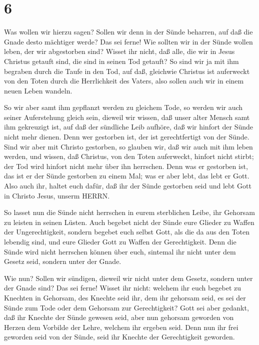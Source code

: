 \hypertarget{section-5}{%
\section{6}\label{section-5}}

 Was wollen wir hierzu sagen? Sollen wir denn in der Sünde
beharren, auf daß die Gnade desto mächtiger werde?  Das sei
ferne! Wie sollten wir in der Sünde wollen leben, der wir abgestorben
sind?  Wisset ihr nicht, daß alle, die wir in Jesus Christus
getauft sind, die sind in seinen Tod getauft?  So sind wir
ja mit ihm begraben durch die Taufe in den Tod, auf daß, gleichwie
Christus ist auferweckt von den Toten durch die Herrlichkeit des Vaters,
also sollen auch wir in einem neuen Leben wandeln.

 So wir aber samt ihm gepflanzt werden zu gleichem Tode, so
werden wir auch seiner Auferstehung gleich sein,  dieweil
wir wissen, daß unser alter Mensch samt ihm gekreuzigt ist, auf daß der
sündliche Leib aufhöre, daß wir hinfort der Sünde nicht mehr dienen.
 Denn wer gestorben ist, der ist gerechtfertigt von der
Sünde.  Sind wir aber mit Christo gestorben, so glauben wir,
daß wir auch mit ihm leben werden,  und wissen, daß
Christus, von den Toten auferweckt, hinfort nicht stirbt; der Tod wird
hinfort nicht mehr über ihn herrschen.  Denn was er
gestorben ist, das ist er der Sünde gestorben zu einem Mal; was er aber
lebt, das lebt er Gott.  Also auch ihr, haltet euch dafür,
daß ihr der Sünde gestorben seid und lebt Gott in Christo Jesus, unserm
HERRN.

 So lasset nun die Sünde nicht herrschen in eurem
sterblichen Leibe, ihr Gehorsam zu leisten in seinen Lüsten.
 Auch begebet nicht der Sünde eure Glieder zu Waffen der
Ungerechtigkeit, sondern begebet euch selbst Gott, als die da aus den
Toten lebendig sind, und eure Glieder Gott zu Waffen der Gerechtigkeit.
 Denn die Sünde wird nicht herrschen können über euch,
sintemal ihr nicht unter dem Gesetz seid, sondern unter der Gnade.

 Wie nun? Sollen wir sündigen, dieweil wir nicht unter dem
Gesetz, sondern unter der Gnade sind? Das sei ferne! 
Wisset ihr nicht: welchem ihr euch begebet zu Knechten in Gehorsam, des
Knechte seid ihr, dem ihr gehorsam seid, es sei der Sünde zum Tode oder
dem Gehorsam zur Gerechtigkeit?  Gott sei aber gedankt, daß
ihr Knechte der Sünde gewesen seid, aber nun gehorsam geworden von
Herzen dem Vorbilde der Lehre, welchem ihr ergeben seid. 
Denn nun ihr frei geworden seid von der Sünde, seid ihr Knechte der
Gerechtigkeit geworden.


